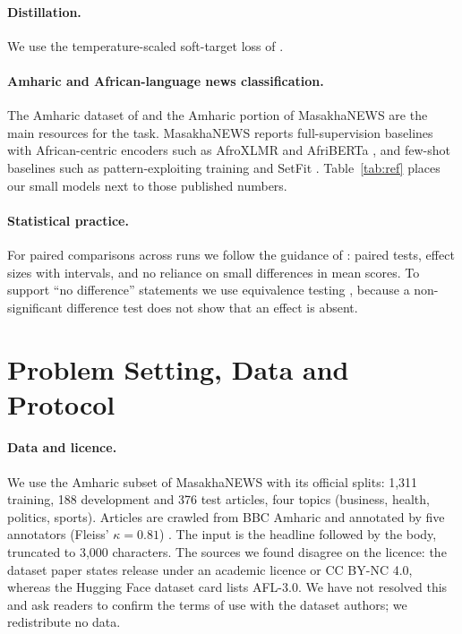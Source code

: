 \documentclass[11pt]{article}
\begin{document}
\paragraph{Distillation.} We use the temperature-scaled soft-target loss of \citet{hinton2015distilling}.

\paragraph{Amharic and African-language news classification.} The Amharic dataset of \citet{azime2021amharic} and the Amharic portion of MasakhaNEWS \citep{adelani2023masakhanews} are the main resources for the task. MasakhaNEWS reports full-supervision baselines with African-centric encoders such as AfroXLMR \citep{alabi2022afroxlmr} and AfriBERTa \citep{ogueji2021afriberta}, and few-shot baselines such as pattern-exploiting training and SetFit \citep{schick2021pet,tunstall2022setfit}. Table~\ref{tab:ref} places our small models next to those published numbers.

\paragraph{Statistical practice.} For paired comparisons across runs we follow the guidance of \citet{dror2018hitchhiker}: paired tests, effect sizes with intervals, and no reliance on small differences in mean scores. To support ``no difference'' statements we use equivalence testing \citep{schuirmann1987comparison,lakens2017equivalence}, because a non-significant difference test does not show that an effect is absent.

\section{Problem Setting, Data and Protocol}
\paragraph{Data and licence.} We use the Amharic subset of MasakhaNEWS with its official splits: 1{,}311 training, 188 development and 376 test articles, four topics (business, health, politics, sports). Articles are crawled from BBC Amharic and annotated by five annotators (Fleiss' $\kappa=0.81$) \citep{adelani2023masakhanews}. The input is the headline followed by the body, truncated to 3{,}000 characters. The sources we found disagree on the licence: the dataset paper states release under an academic licence or CC BY-NC 4.0, whereas the Hugging Face dataset card lists AFL-3.0. We have not resolved this and ask readers to confirm the terms of use with the dataset authors; we redistribute no data.
\end{document}
